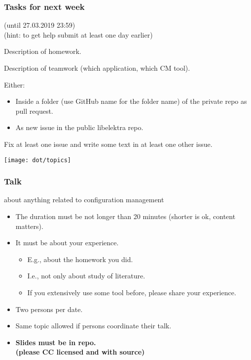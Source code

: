 \begin{assignment}
	\frametitle{Tasks for next week}
	(until 27.03.2019 23:59) \\ 
	(hint: to get help submit at least one day earlier)

	\begin{task}
	Description of homework.
	\end{task}

	\begin{task}
	Description of teamwork (which application, which CM tool).
	\end{task}

	Either:
	\begin{itemize}
	\item Inside a folder (use GitHub name for the folder name) of the private repo as pull request.
	\item As new issue in the public libelektra repo.
	\end{itemize}

	\begin{task}
	Fix at least one issue and write some text in at least one other issue.
	\end{task}
\end{assignment}

\begin{frame}
	\hspace*{-1cm}\texttt{[image: dot/topics]}
\end{frame}

\begin{frame}
	\frametitle{Talk}
	about anything related to configuration management
	\begin{itemize}
		\item The duration must be not longer than 20 minutes (shorter is ok, content matters).
		\item It must be about your experience.
		\begin{itemize}
			\item E.g., about the homework you did.
			\item I.e., not only about study of literature.
			\item If you extensively use some tool before, please share your experience.
		\end{itemize}
		\item Two persons per date.
		\item Same topic allowed if persons coordinate their talk.
		\item \textbf{Slides must be in repo. \\ (please CC licensed and with source)}
	\end{itemize}
\end{frame}


